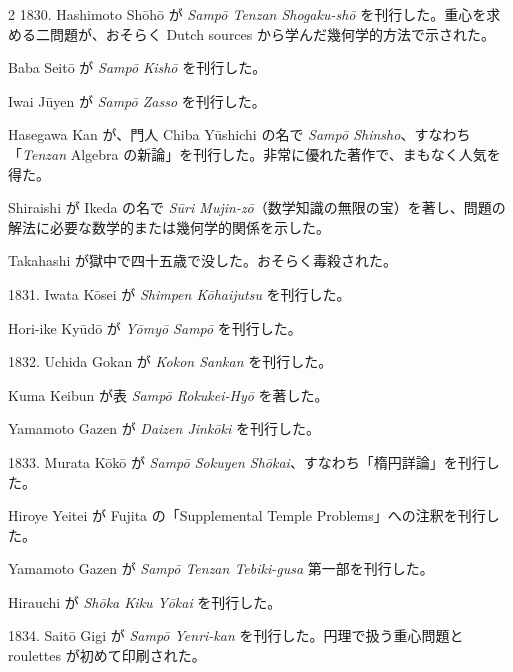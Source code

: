 \documentclass[11pt]{article}
\newcommand{\scanfooter}{}
\begin{document}
\begin{multicols}{2}
1830. Hashimoto Shōhō が \emph{Sampō Tenzan Shogaku-shō} を刊行した。重心を求める二問題が、おそらく Dutch sources から学んだ幾何学的方法で示された。

Baba Seitō が \emph{Sampō Kishō} を刊行した。

Iwai Jūyen が \emph{Sampō Zasso} を刊行した。

Hasegawa Kan が、門人 Chiba Yūshichi の名で \emph{Sampō Shinsho}、すなわち「\emph{Tenzan} Algebra の新論」を刊行した。非常に優れた著作で、まもなく人気を得た。

Shiraishi が Ikeda の名で \emph{Sūri Mujin-zō}（数学知識の無限の宝）を著し、問題の解法に必要な数学的または幾何学的関係を示した。

Takahashi が獄中で四十五歳で没した。おそらく毒殺された。

1831. Iwata Kōsei が \emph{Shimpen Kōhaijutsu} を刊行した。

Hori-ike Kyūdō が \emph{Yōmyō Sampō} を刊行した。

1832. Uchida Gokan が \emph{Kokon Sankan} を刊行した。

Kuma Keibun が表 \emph{Sampō Rokukei-Hyō} を著した。

Yamamoto Gazen が \emph{Daizen Jinkōki} を刊行した。

1833. Murata Kōkō が \emph{Sampō Sokuyen Shōkai}、すなわち「楕円詳論」を刊行した。

Hiroye Yeitei が Fujita の「Supplemental Temple Problems」への注釈を刊行した。

Yamamoto Gazen が \emph{Sampō Tenzan Tebiki-gusa} 第一部を刊行した。

Hirauchi が \emph{Shōka Kiku Yōkai} を刊行した。

1834. Saitō Gigi が \emph{Sampō Yenri-kan} を刊行した。円理で扱う重心問題と roulettes が初めて印刷された。
\end{multicols}
\scanfooter
\end{document}
